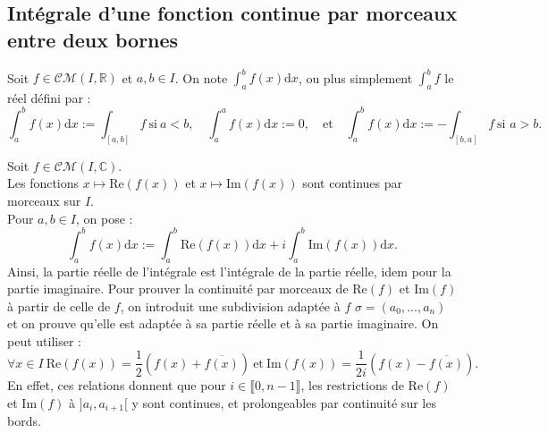 \documentclass[11pt]{article}
\newcommand*{\C}{\mathbb{C}}
\newcommand*{\R}{\mathbb{R}}
\newcommand*{\CM}{\mathcal{CM}}
\newcommand{\0}{\varnothing}
\newcommand*{\s}{\sigma}
\newcommand*{\lb}{\llbracket}
\newcommand*{\rb}{\rrbracket}
\newcommand{\dx}{\textrm{d}x}
\renewcommand*{\Re}{\textrm{Re}}
\renewcommand{\Im}{\textrm{Im}}
\begin{document}
\subsection{Intégrale d'une fonction continue par morceaux entre deux bornes}
\begin{defi}{}{}
    Soit $f\in\CM(I,\R)$ et $a,b\in I$. On note $\int_a^bf(x)\dx$, ou plus simplement $\int_a^bf$ le réel défini par :
    \begin{equation*}
        \int_a^bf(x)\dx:=\int_[a,b]f ~ \text{si} ~ a<b, \quad \int_a^af(x)\dx:=0,\quad \text{et}\quad\int_a^bf(x)\dx:=-\int_{[b,a]}f~\text{si } a>b.
    \end{equation*}
\end{defi}

\begin{prop}{}{}
    Soit $f\in\CM(I,\C)$.\\
    Les fonctions $x\mapsto\Re(f(x))$ et $x\mapsto\Im(f(x))$ sont continues par morceaux sur $I$.\\
    Pour $a,b\in I$, on pose :
    \begin{equation*}
        \int_a^bf(x)\dx:=\int_a^b\Re(f(x))\dx+i\int_a^b\Im(f(x))\dx.
    \end{equation*}
    Ainsi, la partie réelle de l'intégrale est l'intégrale de la partie réelle, idem pour la partie imaginaire.
    \tcblower
    Pour prouver la continuité par morceaux de $\Re(f)$ et $\Im(f)$ à partir de celle de $f$, on introduit une subdivision adaptée à $f$ $\s=(a_0,...,a_n)$ et on prouve qu'elle est adaptée à sa partie réelle et à sa partie imaginaire. On peut utiliser :
    \begin{equation*}
        \forall x\in I ~ \Re(f(x)) = \frac{1}{2}(f(x)+\overline{f(x)}) ~ \text{et} ~ \Im(f(x))=\frac{1}{2i}(f(x)-\overline{f(x)}).
    \end{equation*}
    En effet, ces relations donnent que pour $i\in\lb0,n-1\rb$, les restrictions de $\Re(f)$ et $\Im(f)$ à $]a_i,a_{i+1}[$ y sont continues, et prolongeables par continuité sur les bords.
\end{prop}

\pagebreak
\end{document}
